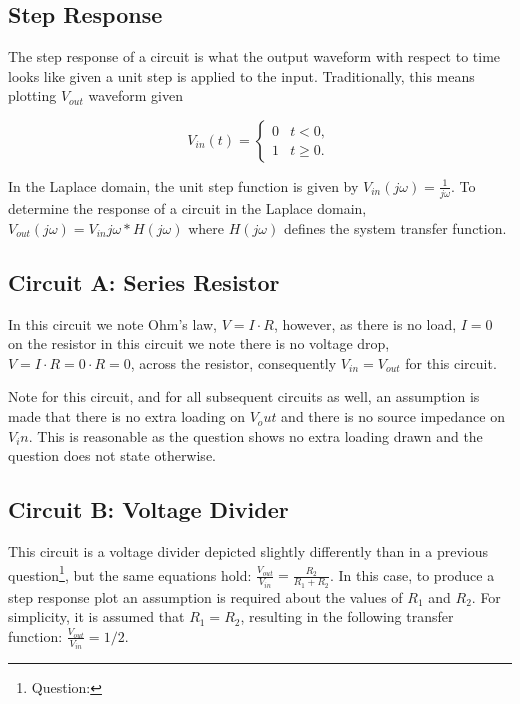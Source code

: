 \documentclass[main.tex]{subfiles}
\begin{document}
\subsection{Step Response}
The step response of a circuit is what the output waveform with respect to time looks like given a unit step is applied to the input. Traditionally, this means plotting $V_{out}$ waveform given 

\[
    V_{in}(t) =
    \begin{cases} 
        0 & t < 0, \\
        1 & t \geq 0.
    \end{cases}
\]

\noindent In the Laplace domain, the unit step function is given by $V_{in}(j \omega) = \frac{1}{j \omega}$. To determine the response of a circuit in the Laplace domain, $V_{out}(j \omega) = V_{in}{j \omega} * H(j \omega)$ where $H(j \omega)$ defines the system transfer function. 


\subsection{Circuit A: Series Resistor}
In this circuit we note Ohm's law, $V = I \cdot R$, however, as there is no load, $I=0$ on the resistor in this circuit we note there is no voltage drop, $V=I \cdot R=0 \cdot R=0$, across the resistor, consequently $V_{in} = V_{out}$ for this circuit.  


Note for this circuit, and for all subsequent circuits as well, an assumption is made that there is no extra loading on $V_out$ and there is no source impedance on $V_in$. This is reasonable as the question shows no extra loading drawn and the question does not state otherwise.

\subsection{Circuit B: Voltage Divider}
This circuit is a voltage divider depicted slightly differently than in a previous question\footnote{Question: }, but the same equations hold: $\frac{V_{out}}{V_{in}} = \frac{R_2}{R_1 + R_2}$. In this case, to produce a step response plot an assumption is required about the values of $R_1$ and $R_2$. For simplicity, it is assumed that $R_1 = R_2$, resulting in the following transfer function: $\frac{V_{out}}{V_{in}} = 1/2$.
\end{document}
